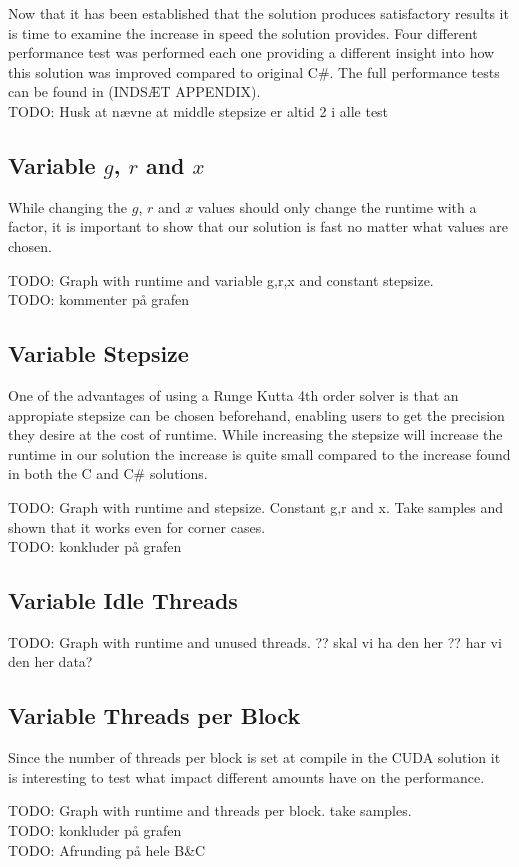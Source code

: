 
Now that it has been established that the solution produces satisfactory results it is time to examine the increase in speed the solution provides. Four different performance test was performed each one providing a different insight into how this solution was improved compared to original C\#. The full performance tests can be found in (INDSÆT APPENDIX). \\

TODO: Husk at nævne at middle stepsize er altid 2 i alle test

\subsection{Variable $g$, $r$ and $x$}
While changing the $g$, $r$ and $x$ values should only change the runtime with a factor, it is important to show that our solution is fast no matter what values are chosen. 

TODO: Graph with runtime and variable g,r,x and constant stepsize. \\
TODO: kommenter på grafen

\subsection{Variable Stepsize}
One of the advantages of using a Runge Kutta 4th order solver is that an appropiate stepsize can be chosen beforehand, enabling users to get the precision they desire at the cost of runtime. While increasing the stepsize will increase the runtime in our solution the increase is quite small compared to the increase found in both the C and C\# solutions.

TODO: Graph with runtime and stepsize. Constant g,r and x. Take samples and shown that it works even for corner cases.\\
TODO: konkluder på grafen

\subsection{Variable Idle Threads}
TODO: Graph with runtime and unused threads. ?? skal vi ha den her ?? har vi den her data?

\subsection{Variable Threads per Block}
Since the number of threads per block is set at compile in the CUDA solution it is interesting to test what impact different amounts have on the performance.

TODO: Graph with runtime and threads per block. take samples.\\
TODO: konkluder på grafen \\

TODO:
Afrunding på hele B\&C
